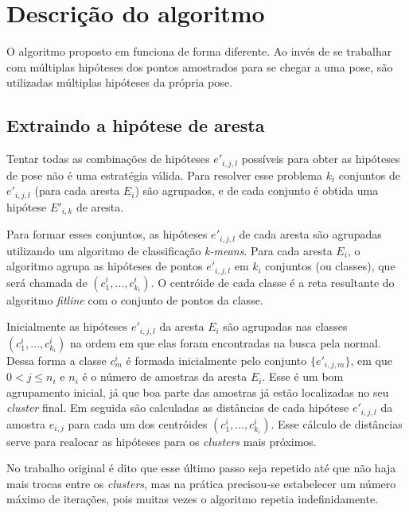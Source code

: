 \section{Descrição do algoritmo}

O algoritmo proposto em \cite{celine} funciona de forma diferente. Ao invés de se trabalhar com múltiplas hipóteses dos pontos amostrados para se chegar a uma pose, são utilizadas múltiplas hipóteses da própria pose.

\subsection{Extraindo a hipótese de aresta}

Tentar todas as combinações de hipóteses $e'_{i,j,l}$ possíveis para obter as hipóteses de pose não é uma estratégia válida. Para resolver esse problema $k_i$ conjuntos de $e'_{i,j,l}$ (para cada aresta $E_i$) são agrupados, e de cada conjunto é obtida uma hipótese $E'_{i,k}$ de aresta.

Para formar esses conjuntos, as hipóteses $e'_{i,j,l}$ de cada aresta são agrupadas utilizando um algoritmo de classificação \emph{k-means}. Para cada aresta $E_i$, o algoritmo agrupa as hipóteses de pontos $e'_{i,j,l}$ em $k_i$ conjuntos (ou classes), que será chamada de $(c^i_1, \dots, c^i_{k_i})$. O centróide de cada classe é a reta resultante do algoritmo \emph{fitline} \cite{fitline_doc} com o conjunto de pontos da classe.

Inicialmente as hipóteses $e'_{i,j,l}$ da aresta $E_i$ são agrupadas nas classes $(c^i_1, \dots, c^i_{k_i})$ na ordem em que elas foram encontradas na busca pela normal. Dessa forma a classe $c^i_m$ é formada inicialmente pelo conjunto $\{e'_{i,j,m}\}$, em que $0 < j \leq n_i$ e $n_i$ é o número de amostras da aresta $E_i$. Esse é um bom agrupamento inicial, já que boa parte das amostras já estão localizadas no seu \emph{cluster} final. Em seguida são calculadas as distâncias de cada hipótese $e'_{i,j,l}$ da amostra $e_{i,j}$ para cada um dos centróides $(c^i_1, \dots, c^i_{k_i})$. Esse cálculo de distâncias serve para realocar as hipóteses para os \emph{clusters} mais próximos.

No trabalho original \cite{celine} é dito que esse último passo seja repetido até que não haja mais trocas entre os \emph{clusters}, mas na prática precisou-se estabelecer um número máximo de iterações, pois muitas vezes o algoritmo repetia indefinidamente.


